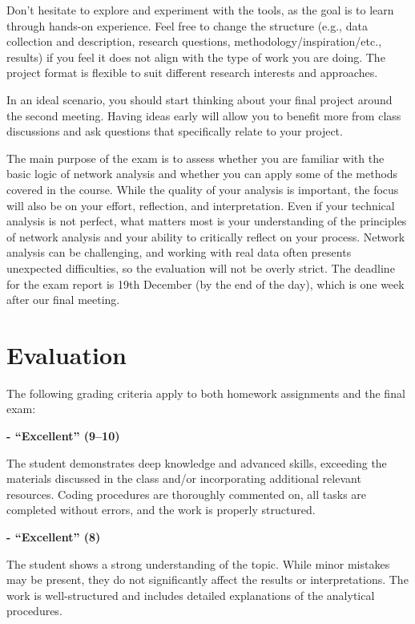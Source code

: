 \documentclass[
]{book}
\begin{document}
Don't hesitate to explore and experiment with the tools, as the goal is to learn through hands-on experience. Feel free to change the structure (e.g., data collection and description, research questions, methodology/inspiration/etc., results) if you feel it does not align with the type of work you are doing. The project format is flexible to suit different research interests and approaches.

In an ideal scenario, you should start thinking about your final project around the second meeting. Having ideas early will allow you to benefit more from class discussions and ask questions that specifically relate to your project.

The main purpose of the exam is to assess whether you are familiar with the basic logic of network analysis and whether you can apply some of the methods covered in the course. While the quality of your analysis is important, the focus will also be on your effort, reflection, and interpretation. Even if your technical analysis is not perfect, what matters most is your understanding of the principles of network analysis and your ability to critically reflect on your process. Network analysis can be challenging, and working with real data often presents unexpected difficulties, so the evaluation will not be overly strict. The deadline for the exam report is 19th December (by the end of the day), which is one week after our final meeting.

\section*{\texorpdfstring{\textbf{Evaluation}}{Evaluation}}\label{evaluation}

The following grading criteria apply to both homework assignments and the final exam:

\textbf{- ``Excellent'' (9--10)}

The student demonstrates deep knowledge and advanced skills, exceeding the materials discussed in the class and/or incorporating additional relevant resources. Coding procedures are thoroughly commented on, all tasks are completed without errors, and the work is properly structured.

\textbf{- ``Excellent'' (8)}

The student shows a strong understanding of the topic. While minor mistakes may be present, they do not significantly affect the results or interpretations. The work is well-structured and includes detailed explanations of the analytical procedures.
\end{document}
